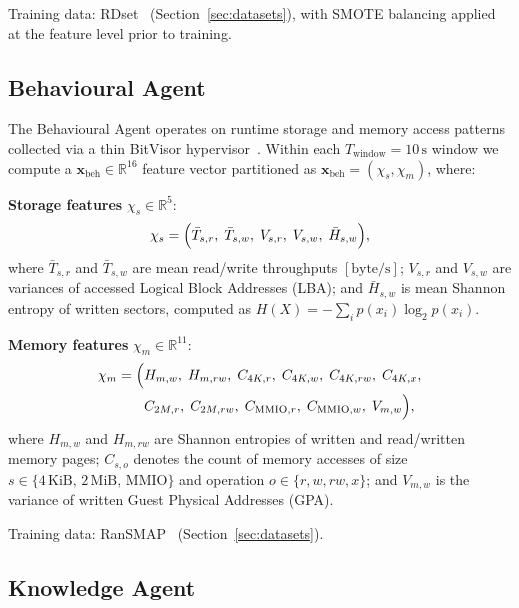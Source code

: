 \documentclass[journal]{IEEEtran}
\newcommand{\R}{\mathbb{R}}
\begin{document}
Training data: RDset~\cite{kabuye2025explainable,mathur2020ransomware}
(Section~\ref{sec:datasets}), with SMOTE balancing applied at the feature
level prior to training.

\subsection{Behavioural Agent}

The Behavioural Agent operates on runtime storage and memory access patterns
collected via a thin BitVisor hypervisor~\cite{hirano2025ransmap}. Within
each $T_{\text{window}}=10\,\text{s}$ window we compute a
$\mathbf{x}_{\text{beh}} \in \R^{16}$ feature vector partitioned as
$\mathbf{x}_{\text{beh}} = (\chi_s, \chi_m)$, where:

\textbf{Storage features} $\chi_s \in \R^{5}$:
\begin{equation}\label{eq:storage_features}
  \chi_s = \Bigl(
    \bar{T}_{s,r},\;
    \bar{T}_{s,w},\;
    V_{s,r},\;
    V_{s,w},\;
    \bar{H}_{s,w}
  \Bigr),
\end{equation}
where $\bar{T}_{s,r}$ and $\bar{T}_{s,w}$ are mean read/write throughputs
$[\text{byte/s}]$; $V_{s,r}$ and $V_{s,w}$ are variances of accessed Logical
Block Addresses (LBA); and $\bar{H}_{s,w}$ is mean Shannon entropy of written
sectors, computed as $H(X) = -\sum_i p(x_i) \log_2 p(x_i)$.

\textbf{Memory features} $\chi_m \in \R^{11}$:
\begin{align}\label{eq:memory_features}
  \chi_m = \Bigl(
    &H_{m,w},\; H_{m,rw},\;
     C_{4K,r},\; C_{4K,w},\; C_{4K,rw},\; C_{4K,x},\nonumber\\
    &C_{2M,r},\; C_{2M,rw},\;
     C_{\text{MMIO},r},\; C_{\text{MMIO},w},\;
     V_{m,w}
  \Bigr),
\end{align}
where $H_{m,w}$ and $H_{m,rw}$ are Shannon entropies of written and
read/written memory pages; $C_{s,o}$ denotes the count of memory accesses of
size $s \in \{4\,\text{KiB},\,2\,\text{MiB},\,\text{MMIO}\}$ and operation
$o \in \{r,w,rw,x\}$; and $V_{m,w}$ is the variance of written Guest Physical
Addresses (GPA).

Training data: RanSMAP~\cite{hirano2025ransmap} (Section~\ref{sec:datasets}).

\subsection{Knowledge Agent}
\end{document}
